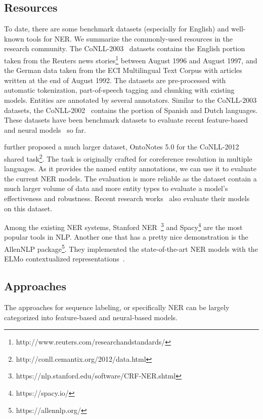 \subsection{Resources}
To date, there are some benchmark datasets (especially for English) and well-known tools for NER. 
We summarize the commonly-used resources in the research community. 
The CoNLL-2003~\cite{tjong2003introduction} datasets contains the English portion taken from the Reuters news stories\footnote{http://www.reuters.com/researchandstandards/} between August 1996 and August 1997, and the German data taken from the ECI Multilingual Text Corpus with articles written at the end of August 1992. 
The datasets are pre-processed with automatic tokenization, part-of-speech tagging and chunking with existing models. 
Entities are annotated by several annotators. 
Similar to the CoNLL-2003 datasets, the CoNLL-2002~\cite{tjong2002introduction} contains the portion of Spanish and Dutch languages. 
These datasets have been benchmark datasets to evaluate recent feature-based~\cite{ling2012fine,finkel2005incorporating} and neural models~\cite{collobert2011torch7,chiu2016named,lample2016neural,ma2016end,peters2018deep,devlin2019bert} so far. 

\citet{pradhan2012conll,pradhan2013towards} further proposed a much larger dataset, OntoNotes 5.0 for the CoNLL-2012 shared task\footnote{http://conll.cemantix.org/2012/data.html}. 
The task is originally crafted for coreference resolution in multiple languages. 
As it provides the named entity annotations, we can use it to evaluate the current NER models. 
The evaluation is more reliable as the dataset contain a much larger volume of data and more entity types to evaluate a model's effectiveness and robustness. 
Recent research works~\cite{li2017leveraging,ghaddar2018robust,jie2019dependency,liu2019towards} also evaluate their models on this dataset.

Among the existing NER systems, Stanford NER~\cite{finkel2005incorporating}\footnote{https://nlp.stanford.edu/software/CRF-NER.shtml} and Spacy\footnote{https://spacy.io/} are the most popular tools in NLP. 
Another one that has a pretty nice demonstration is the AllenNLP package\footnote{https://allennlp.org/}. 
They implemented the state-of-the-art NER models with the ELMo contextualized representations~\cite{peters2018deep}.

\subsection{Approaches}
The approaches for sequence labeling, or specifically NER can be largely categorized into feature-based and neural-based models.
